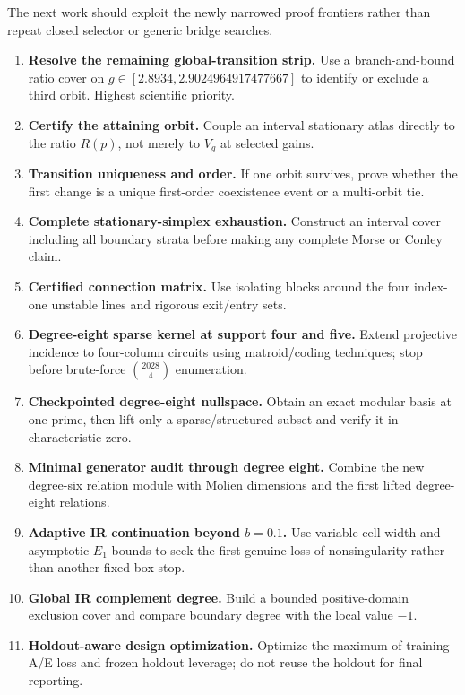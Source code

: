 \documentclass[11pt,a4paper]{article}
\begin{document}
The next work should exploit the newly narrowed proof frontiers rather than
repeat closed selector or generic bridge searches.

\begin{enumerate}[label=\textbf{ST\arabic*:},start=462,leftmargin=2.2cm]
\item \textbf{Resolve the remaining global-transition strip.}  Use a
branch-and-bound ratio cover on $g\in[2.8934,2.9024964917477667]$ to identify
or exclude a third orbit.  Highest scientific priority.
\item \textbf{Certify the attaining orbit.}  Couple an interval stationary
atlas directly to the ratio $R(p)$, not merely to $V_g$ at selected gains.
\item \textbf{Transition uniqueness and order.}  If one orbit survives, prove
whether the first change is a unique first-order coexistence event or a
multi-orbit tie.
\item \textbf{Complete stationary-simplex exhaustion.}  Construct an interval
cover including all boundary strata before making any complete Morse or
Conley claim.
\item \textbf{Certified connection matrix.}  Use isolating blocks around the
four index-one unstable lines and rigorous exit/entry sets.
\item \textbf{Degree-eight sparse kernel at support four and five.}  Extend
projective incidence to four-column circuits using matroid/coding techniques;
stop before brute-force $\binom{2028}{4}$ enumeration.
\item \textbf{Checkpointed degree-eight nullspace.}  Obtain an exact modular
basis at one prime, then lift only a sparse/structured subset and verify it in
characteristic zero.
\item \textbf{Minimal generator audit through degree eight.}  Combine the new
degree-six relation module with Molien dimensions and the first lifted
degree-eight relations.
\item \textbf{Adaptive IR continuation beyond $b=0.1$.}  Use variable cell
width and asymptotic $E_1$ bounds to seek the first genuine loss of
nonsingularity rather than another fixed-box stop.
\item \textbf{Global IR complement degree.}  Build a bounded positive-domain
exclusion cover and compare boundary degree with the local value $-1$.
\item \textbf{Holdout-aware design optimization.}  Optimize the maximum of
training A/E loss and frozen holdout leverage; do not reuse the holdout for
final reporting.

\end{enumerate}
\end{document}
